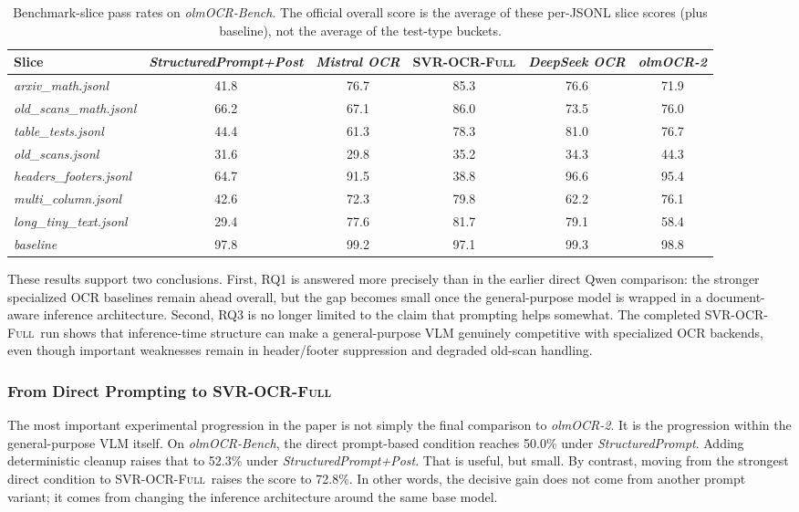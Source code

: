 \documentclass[conference]{IEEEtran}
\newcommand{\papername}[1]{\textit{#1}}
\newcommand{\svrocr}{\textsc{SVR-OCR-Full}}
\newcommand{\olmocr}{\papername{olmOCR-2}}
\begin{document}
\begin{table}[t]
\caption{Benchmark-slice pass rates on \papername{olmOCR-Bench}. The official overall score is the average of these per-JSONL slice scores (plus baseline), not the average of the test-type buckets.}
\label{tab:backend-slices}
\centering
\footnotesize
\begin{tabular}{lccccc}
\toprule
Slice & \papername{StructuredPrompt+Post} & \papername{Mistral OCR} & \svrocr & \papername{DeepSeek OCR} & \olmocr \\
\midrule
\papername{arxiv\_math.jsonl} & 41.8 & 76.7 & 85.3 & 76.6 & 71.9 \\
\papername{old\_scans\_math.jsonl} & 66.2 & 67.1 & 86.0 & 73.5 & 76.0 \\
\papername{table\_tests.jsonl} & 44.4 & 61.3 & 78.3 & 81.0 & 76.7 \\
\papername{old\_scans.jsonl} & 31.6 & 29.8 & 35.2 & 34.3 & 44.3 \\
\papername{headers\_footers.jsonl} & 64.7 & 91.5 & 38.8 & 96.6 & 95.4 \\
\papername{multi\_column.jsonl} & 42.6 & 72.3 & 79.8 & 62.2 & 76.1 \\
\papername{long\_tiny\_text.jsonl} & 29.4 & 77.6 & 81.7 & 79.1 & 58.4 \\
\papername{baseline} & 97.8 & 99.2 & 97.1 & 99.3 & 98.8 \\
\bottomrule
\end{tabular}
\end{table}

These results support two conclusions. First, RQ1 is answered more precisely than in the earlier direct Qwen comparison: the stronger specialized OCR baselines remain ahead overall, but the gap becomes small once the general-purpose model is wrapped in a document-aware inference architecture. Second, RQ3 is no longer limited to the claim that prompting helps somewhat. The completed \svrocr\ run shows that inference-time structure can make a general-purpose VLM genuinely competitive with specialized OCR backends, even though important weaknesses remain in header/footer suppression and degraded old-scan handling.

\subsubsection{From Direct Prompting to \svrocr}

The most important experimental progression in the paper is not simply the final comparison to \olmocr. It is the progression within the general-purpose VLM itself. On \papername{olmOCR-Bench}, the direct prompt-based condition reaches 50.0\% under \papername{StructuredPrompt}. Adding deterministic cleanup raises that to 52.3\% under \papername{StructuredPrompt+Post}. That is useful, but small. By contrast, moving from the strongest direct condition to \svrocr\ raises the score to 72.8\%. In other words, the decisive gain does not come from another prompt variant; it comes from changing the inference architecture around the same base model.
\end{document}
